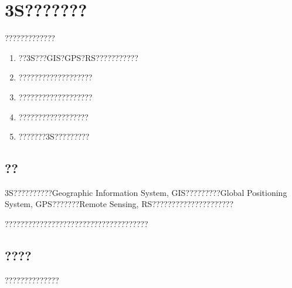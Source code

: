 \chapter{3S???????}

\begin{learningobjectives}
?????????????
\begin{enumerate}
    \item ??3S???GIS?GPS?RS???????????
    \item ???????????????????
    \item ???????????????????
    \item ??????????????????
    \item ???????3S?????????
\end{enumerate}
\end{learningobjectives}

\section{??}

3S??????????Geographic Information System, GIS?????????Global Positioning System, GPS???????Remote Sensing, RS?????????????????????

?????????????????????????????????????

\section{????}

??????????????

